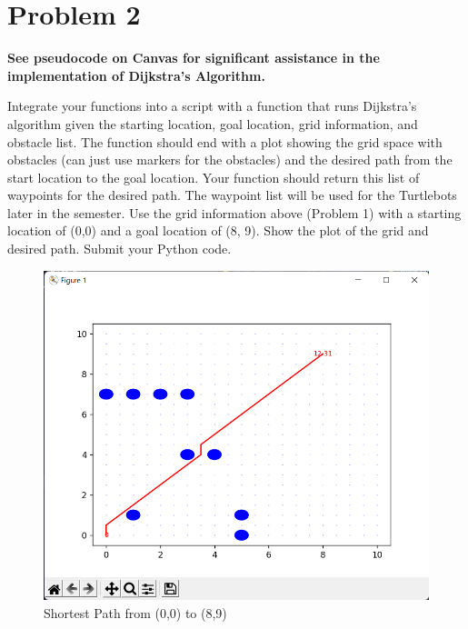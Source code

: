 \documentclass{article}
\begin{document}
\section*{Problem 2}


\textbf{See pseudocode on Canvas for significant assistance in the implementation of Dijkstra’s 
Algorithm.}

\bigskip
Integrate your functions into a script with a function that runs Dijkstra’s algorithm given the starting 
location, goal location, grid information, and obstacle list. The function should end with a plot 
showing the grid space with obstacles (can just use markers for the obstacles) and the desired path 
from the start location to the goal location. Your function should return this list of waypoints for the 
desired path. The waypoint list will be used for the Turtlebots later in the semester.
Use the grid information above (Problem 1) with a starting location of (0,0) and a goal location of (8,
9). 
Show the plot of the grid and desired path.
Submit your Python code.

\begin{figure}[h]
    \centering
    \includegraphics[width=12cm]{question2.png}
    \caption*{Shortest Path from (0,0) to (8,9)}
\end{figure}
\end{document}
